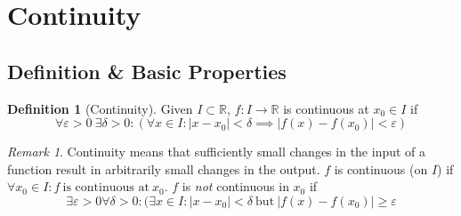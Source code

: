 \documentclass[english,titlepage]{uzhpub}
\theoremstyle{definition}
\newtheorem{definition}{Definition}[section]
\theoremstyle{plain}
\theoremstyle{remark}
\newtheorem*{remark}{Remark}
\theoremstyle{example}
\begin{document}
   \section{Continuity}
   \subsection{Definition \& Basic Properties}
   \begin{definition}[Continuity]\label{def:continuity}
      Given \(I \subset \mathbb{R}\), \(f: I \to \mathbb{R}\) is continuous at \(x_0 \in I\) if
      \[\forall \varepsilon > 0~\exists \delta > 0: (\forall x \in I: |x-x_0| < \delta \implies |f(x) - f(x_0)| < \varepsilon)\]
   \end{definition}
   \begin{remark}
      Continuity means that sufficiently small changes in the input of a function result in arbitrarily small changes in the output.
      \(f\) is continuous (on \(I\)) if \(\forall x_0 \in I: f~\text{is continuous at}~x_0\).
      \(f\) is \textit{not} continuous in \(x_0\) if
      \[\exists \varepsilon > 0 \forall \delta > 0: (\exists x \in I: |x - x_0| < \delta~\text{but}~|f(x) - f(x_0)| \geq \varepsilon\]
   \end{remark}

   \begin{center}
      
   \end{center}
\end{document}
